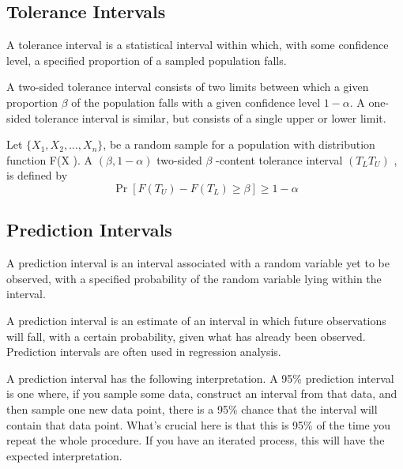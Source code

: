 \documentclass[]{report}
\begin{document}
\subsection{Tolerance Intervals}
A tolerance interval is a statistical interval within which, with some confidence level, a specified proportion of a sampled population falls.

A two-sided tolerance interval consists of two limits between which a given proportion $\beta$ of the population falls with a given confidence
level $1−\alpha$. A one-sided tolerance interval is similar, but consists of a single upper or lower limit.


Let $\{X_1, X_2, \ldots , X_n  \}$, be a random sample for a population with distribution function F(X ). A $(\beta,1−\alpha)$ two-sided
$\beta$ -content tolerance interval $(T_L T_U ) $ , is defined by
\[ \Pr[F(T_U ) − F(T_L ) \geq \beta ] ≥ 1−\alpha\]


\subsection{Prediction Intervals}
A prediction interval is an interval associated with a random variable yet to be observed, with a specified probability of the random variable lying within the interval. 

A prediction interval is an estimate of an interval in which future observations will fall, with a certain probability, given what has already been observed. Prediction intervals are often used in regression analysis.

A prediction interval has the following interpretation. A 95\% prediction interval is one where, if you sample some data, construct an interval from that data, and then sample one new data point, there is a 95\% chance that the interval will contain that data point. What's crucial here is that this is 95\% of the time you repeat the whole procedure. 
If you have an iterated process, this will have the expected interpretation. 
\end{document}
